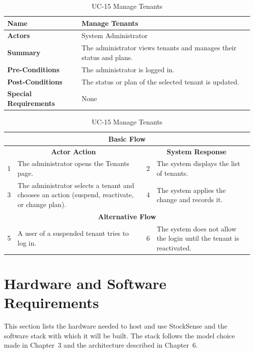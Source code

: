 \documentclass{StockSense}
\begin{document}
\begin{table}[!htbp]
\centering
\caption{UC-15 Manage Tenants}
{\small\linespread{1}\selectfont
\begin{tabular}{|p{}|p{}|}
\hline
\textbf{Name} & Manage Tenants \\ \hline
\textbf{Actors} & System Administrator \\ \hline
\textbf{Summary} & The administrator views tenants and manages their status and plans. \\ \hline
\textbf{Pre-Conditions} & The administrator is logged in. \\ \hline
\textbf{Post-Conditions} & The status or plan of the selected tenant is updated. \\ \hline
\textbf{Special Requirements} & None \\ \hline
\end{tabular}\par\nointerlineskip
\begin{tabular}{|p{}|p{}|p{}|p{}|}
\multicolumn{4}{|c|}{\textbf{Basic Flow}} \\ \hline
\multicolumn{2}{|c|}{\textbf{Actor Action}} & \multicolumn{2}{c|}{\textbf{System Response}} \\ \hline
1 & The administrator opens the Tenants page. & 2 & The system displays the list of tenants. \\ \hline
3 & The administrator selects a tenant and chooses an action (suspend, reactivate, or change plan). & 4 & The system applies the change and records it. \\ \hline
\multicolumn{4}{|c|}{\textbf{Alternative Flow}} \\ \hline
5 & A user of a suspended tenant tries to log in. & 6 & The system does not allow the login until the tenant is reactivated. \\ \hline
\end{tabular}\par}
\end{table}

\FloatBarrier
\section{Hardware and Software Requirements}

This section lists the hardware needed to host and use StockSense and the software stack with which it will be built. The stack follows the model choice made in Chapter~3 and the architecture described in Chapter~6.
\end{document}
